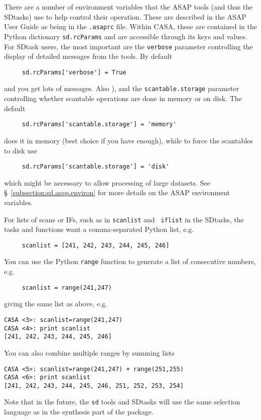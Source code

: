 There are a number of environment variables that the ASAP tools
(and thus the SDtasks) use to help control their operation.
These are described in the ASAP User Guide as being in the 
{\tt .asaprc} file.  Within CASA, these are contained in the
Python dictionary {\tt sd.rcParams} and are accessible through
its keys and values.  For SDtask users, the most important are the
{\tt verbose} parameter controlling the display of detailed
messages from the tools. By default 
\small
\begin{verbatim}
     sd.rcParams['verbose'] = True
\end{verbatim}
\normalsize
and you get lots of messages.  Also
), and the {\tt scantable.storage}
parameter controlling whether scantable operations are done
in memory or on disk.  The default 
\small
\begin{verbatim}
     sd.rcParams['scantable.storage'] = 'memory'
\end{verbatim}
\normalsize
does it in memory (best choice if you have enough), while to
force the scantables to disk use
\small
\begin{verbatim}
     sd.rcParams['scantable.storage'] = 'disk'
\end{verbatim}
\normalsize
which might be necessary to allow processing of large datasets.
See \S~\ref{subsection:sd.asap.environ} for more details on the
ASAP environment variables.

For lists of scans or IFs, such as in {\tt scanlist} and {\tt
iflist} in the SDtasks, the tasks and functions want a comma-separated 
Python list, e.g.
\small
\begin{verbatim}
     scanlist = [241, 242, 243, 244, 245, 246]
\end{verbatim}
\normalsize
You can use the Python {\tt range} function to generate a list of
consecutive numbers, e.g.
\small
\begin{verbatim}
     scanlist = range(241,247)
\end{verbatim}
\normalsize
giving the same list as above, e.g.
\small
\begin{verbatim}
CASA <3>: scanlist=range(241,247)
CASA <4>: print scanlist
[241, 242, 243, 244, 245, 246]
\end{verbatim}
\normalsize
You can also combine multiple ranges by summing lists
\small
\begin{verbatim}
CASA <5>: scanlist=range(241,247) + range(251,255)
CASA <6>: print scanlist
[241, 242, 243, 244, 245, 246, 251, 252, 253, 254]
\end{verbatim}
\normalsize
Note that in the future, the {\tt sd} tools and SDtasks will use
the same selection language as in the synthesis part of the package.

